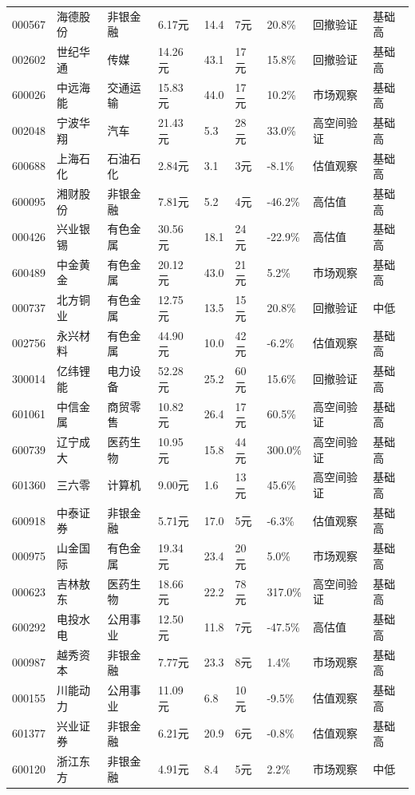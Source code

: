 \begin{longtable}{L{1.0cm}L{1.55cm}L{1.4cm}R{1.0cm}R{1.0cm}R{1.0cm}R{1.05cm}L{3.6cm}L{0.9cm}}
000567 & 海德股份 & 非银金融 & 6.17元 & 14.4 & 7元 & 20.8\% & 回撤验证 & 基础高 \\
002602 & 世纪华通 & 传媒 & 14.26元 & 43.1 & 17元 & 15.8\% & 回撤验证 & 基础高 \\
600026 & 中远海能 & 交通运输 & 15.83元 & 44.0 & 17元 & 10.2\% & 市场观察 & 基础高 \\
002048 & 宁波华翔 & 汽车 & 21.43元 & 5.3 & 28元 & 33.0\% & 高空间验证 & 基础高 \\
600688 & 上海石化 & 石油石化 & 2.84元 & 3.1 & 3元 & -8.1\% & 估值观察 & 基础高 \\
600095 & 湘财股份 & 非银金融 & 7.81元 & 5.2 & 4元 & -46.2\% & 高估值 & 基础高 \\
000426 & 兴业银锡 & 有色金属 & 30.56元 & 18.1 & 24元 & -22.9\% & 高估值 & 基础高 \\
600489 & 中金黄金 & 有色金属 & 20.12元 & 43.0 & 21元 & 5.2\% & 市场观察 & 基础高 \\
000737 & 北方铜业 & 有色金属 & 12.75元 & 13.5 & 15元 & 20.8\% & 回撤验证 & 中低 \\
002756 & 永兴材料 & 有色金属 & 44.90元 & 10.0 & 42元 & -6.2\% & 估值观察 & 基础高 \\
300014 & 亿纬锂能 & 电力设备 & 52.28元 & 25.2 & 60元 & 15.6\% & 回撤验证 & 基础高 \\
601061 & 中信金属 & 商贸零售 & 10.82元 & 26.4 & 17元 & 60.5\% & 高空间验证 & 基础高 \\
600739 & 辽宁成大 & 医药生物 & 10.95元 & 15.8 & 44元 & 300.0\% & 高空间验证 & 基础高 \\
601360 & 三六零 & 计算机 & 9.00元 & 1.6 & 13元 & 45.6\% & 高空间验证 & 基础高 \\
600918 & 中泰证券 & 非银金融 & 5.71元 & 17.0 & 5元 & -6.3\% & 估值观察 & 基础高 \\
000975 & 山金国际 & 有色金属 & 19.34元 & 23.4 & 20元 & 5.0\% & 市场观察 & 基础高 \\
000623 & 吉林敖东 & 医药生物 & 18.66元 & 22.2 & 78元 & 317.0\% & 高空间验证 & 基础高 \\
600292 & 电投水电 & 公用事业 & 12.50元 & 11.8 & 7元 & -47.5\% & 高估值 & 基础高 \\
000987 & 越秀资本 & 非银金融 & 7.77元 & 23.3 & 8元 & 1.4\% & 市场观察 & 基础高 \\
000155 & 川能动力 & 公用事业 & 11.09元 & 6.8 & 10元 & -9.5\% & 估值观察 & 基础高 \\
601377 & 兴业证券 & 非银金融 & 6.21元 & 20.9 & 6元 & -0.8\% & 估值观察 & 基础高 \\
600120 & 浙江东方 & 非银金融 & 4.91元 & 8.4 & 5元 & 2.2\% & 市场观察 & 中低 \\

\end{longtable}
